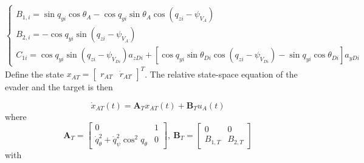 \begin{equation}
\label{eq:13}
\left\{ {\begin{array}{*{20}{l}}
  {{B_{1,i}} = \sin {q_{yi}}\cos {\theta _A} - \cos {q_{yi}}\sin {\theta _A}\cos \left( {{q_{zi}} - {\psi _{{V_A}}}} \right)} \\ 
  {{B_{2,i}} =  - \cos {q_{yi}}\sin \left( {{q_{zi}} - {\psi _{{V_A}}}} \right)} \\ 
  {{C_{1i}} = \cos {q_{yi}}\sin \left( {{q_{zi}} - {\psi _{{V_{Di}}}}} \right){a_{zDi}} + [\cos {q_{yi}}\sin {\theta _{Di}}\cos \left( {{q_{zi}} - {\psi _{{V_{Di}}}}} \right) - \sin {q_{yi}}\cos {\theta _{Di}}]{a_{yDi}}} 
\end{array}} \right.
\end{equation}
Define the state ${x_{AT}} = {\left[ {\begin{array}{*{20}{c}}
  {{r_{AT}}}&{{{\dot r}_{AT}}} 
\end{array}} \right]^T}$. The relative state-space equation of the evader and the target is then

\begin{equation}
\label{eq:14}
{\dot x_{AT}}(t) = {{\mathbf{A}}_T}{x_{AT}}(t) + {{\mathbf{B}}_T}{u_A}(t)
\end{equation}
where
\[{{\mathbf{A}}_T} = \left[ {\begin{array}{*{20}{c}}
  0&1 \\ 
  {\dot q_\theta ^2 + \dot q_\psi ^2{{\cos }^2}{q_\theta }}&0 
\end{array}} \right],\ {{\mathbf{B}}_T} = \left[ {\begin{array}{*{20}{c}}
  0&0 \\ 
  {{B_{1,T}}}&{{B_{2,T}}} 
\end{array}} \right]\]
with

